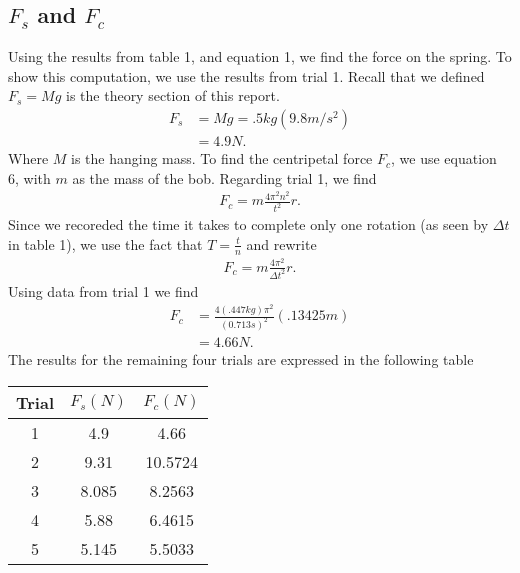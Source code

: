 \documentclass{report}
\begin{document}
    \subsection{$F_{s}$ and $F_{c}$}
    \bigbreak \noindent 
    Using the results from table 1, and equation 1, we find the force on the spring. To show this computation, we use the results from trial 1. Recall that we defined $F_{s} = Mg$ is the theory section of this report.
    \begin{align*}
        F_{s} &= Mg = .5kg(9.8m/s^{2}) \\
        &=4.9N
    .\end{align*}
    \bigbreak \noindent 
    Where $M$ is the hanging mass. To find the centripetal force $F_{c}$, we use equation 6, with $m$ as the mass of the bob. Regarding trial 1, we find
    \begin{align*}
        F_{c} = m \frac{4\pi^{2}n^{2}}{t^{2}}r
    .\end{align*}
    Since we recoreded the time it takes to complete only one rotation (as seen by $\Delta t$ in table 1), we use the fact that $T = \frac{t}{n} $ and rewrite
    \begin{align*}
        F_{c} = m \frac{4\pi^{2}}{\Delta t^{2}}r
    .\end{align*}
    Using data from trial 1 we find
    \begin{align*}
        F_{c} &= \frac{4(.447kg)\pi^{2}}{(0.713s)^{2}}(.13425m) \\
        &=4.66N
    .\end{align*}
    \bigbreak \noindent 
    The results for the remaining four trials are expressed in the following table
    \bigbreak \noindent 
    \begin{center}
        \begin{tabular}{c|c|c}
            Trial & $F_{s} (N)$ &$F_{c} (N)$ \\
            \hline
            1 & 4.9 & 4.66\\
            2 & 9.31 & 10.5724 \\
            3 &8.085 & 8.2563 \\
            4 &5.88 & 6.4615 \\
            5 &5.145 & 5.5033
        \end{tabular}
    \end{center}


    \bigbreak \noindent 
\end{document}
